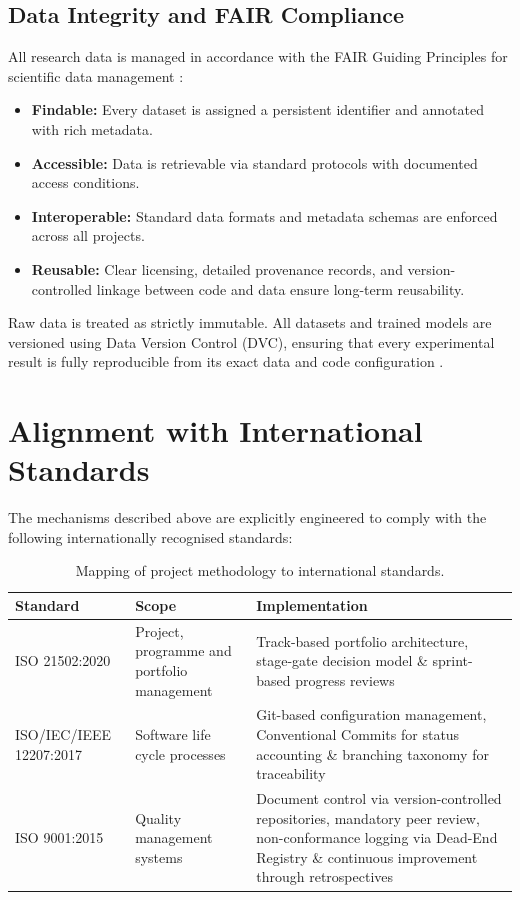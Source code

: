 \documentclass[11pt, a4paper]{article}
\begin{document}
\subsection{Data Integrity and FAIR Compliance}

All research data is managed in accordance with the FAIR Guiding Principles for scientific data management \cite{wilkinson2016fair}:

\begin{itemize}
    \item \textbf{Findable:} Every dataset is assigned a persistent identifier and annotated with rich metadata.
    \item \textbf{Accessible:} Data is retrievable via standard protocols with documented access conditions.
    \item \textbf{Interoperable:} Standard data formats and metadata schemas are enforced across all projects.
    \item \textbf{Reusable:} Clear licensing, detailed provenance records, and version-controlled linkage between code and data ensure long-term reusability.
\end{itemize}

Raw data is treated as strictly immutable. All datasets and trained models are versioned using Data Version Control (DVC), ensuring that every experimental result is fully reproducible from its exact data and code configuration \cite[Sec. 6.3.5]{iso_iec_ieee_12207_2017} \cite{iso9001_2015}. 

\section{Alignment with International Standards}\label{sec:standards}

The mechanisms described above are explicitly engineered to comply with the following internationally recognised standards:

\begin{table}[h]
\centering
\small
\begin{tabular}{p{3.0cm} p{4cm} p{6.3cm}}
\hline
\textbf{Standard} & \textbf{Scope} & \textbf{Implementation} \\
\hline
ISO 21502:2020 \cite{iso21502_2020} &   Project, programme and portfolio management &   Track-based portfolio architecture, stage-gate decision model \& sprint-based progress reviews \\[6pt]
ISO/IEC/IEEE 12207:2017 \cite{iso_iec_ieee_12207_2017} & Software life cycle processes & Git-based configuration management, Conventional Commits for status accounting \& branching taxonomy for traceability \\[6pt]
ISO 9001:2015 \cite{iso9001_2015} & Quality management systems & Document control via version-controlled repositories, mandatory peer review, non-conformance logging via Dead-End Registry \& continuous improvement through retrospectives \\
\hline
\end{tabular}
\caption{Mapping of project methodology to international standards.}
\label{tab:standards}
\end{table}
\end{document}
